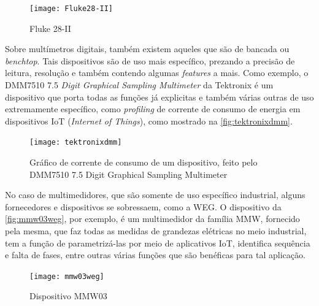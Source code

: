 \begin{figure}[htb!]%
    \caption{Fluke 28-II}%
    \label{fig:Fluke28-II}%
    \texttt{[image: Fluke28-II]}%
\end{figure}

Sobre multímetros digitais, também existem aqueles que são de bancada ou \textit{benchtop}. Tais dispositivos são de uso mais específico, prezando a precisão de leitura, resolução e também contendo algumas \textit{features} a mais. Como exemplo, o DMM7510 7.5 \textit{Digit Graphical Sampling Multimeter} da Tektronix é um dispositivo que porta todas as funções já explicitas e também várias outras de uso extremamente específico, como \textit{profiling} de corrente de consumo de energia em dispositivos \gls{IoT} (\textit{Internet of Things}), como mostrado na \autoref{fig:tektronixdmm}.

\begin{figure}[htb!]%
    \caption{Gráfico de corrente de consumo de um dispositivo, feito pelo DMM7510 7.5 Digit Graphical Sampling Multimeter}%
    \label{fig:tektronixdmm}%
    \texttt{[image: tektronixdmm]}%
\end{figure}

No caso de multimedidores, que são somente de uso específico industrial, alguns fornecedores e dispositivos se sobressaem, como a WEG. O dispositivo da \autoref{fig:mmw03weg}, por exemplo, é um multimedidor da família MMW, fornecido pela mesma, que faz todas as medidas de grandezas elétricas no meio industrial, tem a função de parametrizá-las por meio de aplicativos \gls{IoT}, identifica sequência e falta de fases, entre outras várias funções que são benéficas para tal aplicação. 

\begin{figure}[htb!]%
    \caption{Dispositivo MMW03}%
    \label{fig:mmw03weg}%
    \texttt{[image: mmw03weg]}%
\end{figure}


